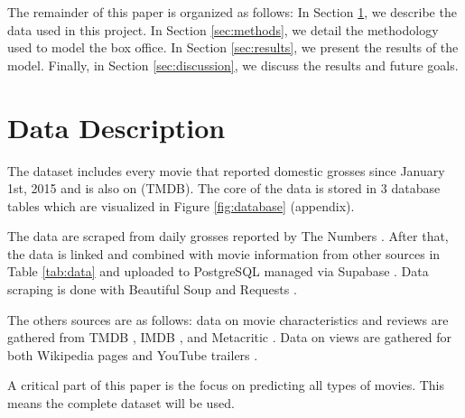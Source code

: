 \documentclass[12pt]{article}
\begin{document}
The remainder of this paper is organized as follows: In Section \ref{sec:data}, we describe the data used in this project. In Section \ref{sec:methods}, we detail the methodology used to model the box office. In Section \ref{sec:results}, we present the results of the model. Finally, in Section \ref{sec:discussion}, we discuss the results and future goals.

\section{Data Description} \label{sec:data}

The dataset includes every movie that reported domestic grosses since January 1st, 2015 and is also on \cite{tmdbHome} (TMDB). The core of the data is stored in 3 database tables which are visualized in Figure \ref{fig:database} (appendix).

The data are scraped from daily grosses reported by The Numbers \citep{numbersHome}. After that, the data is linked and combined with movie information from other sources in Table \ref{tab:data} and uploaded to PostgreSQL \citep{postgresHome} managed via Supabase \citep{supabaseHome}. Data scraping is done with Beautiful Soup \citep{beautifulSoupHome} and Requests \citep{requestsHome}.

The others sources are as follows: data on movie characteristics and reviews are gathered from TMDB \citep{tmdbHome}, IMDB \citep{imdbHome}, and Metacritic \citep{metacriticHome}. Data on views are gathered for both Wikipedia pages \citep{wikipediaPageViews} and YouTube trailers \citep{youtubeHome}. 

A critical part of this paper is the focus on predicting all types of movies. This means the complete dataset will be used.
\end{document}
